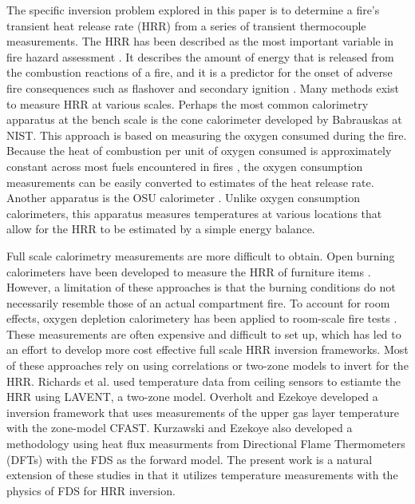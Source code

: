 \documentclass{article}
\begin{document}
The specific inversion problem explored in this paper is to determine a fire's transient heat release rate (HRR) from a series of transient thermocouple measurements. The HRR has been described as the most important variable in fire hazard assessment \cite{babrauskas1992heat}. It describes the amount of energy that is released from the combustion reactions of a fire, and it is a predictor for the onset of adverse fire consequences such as flashover \cite{mccaffrey1981estimating} and secondary ignition \cite{jahn2008effect}. Many methods exist to measure HRR at various scales. Perhaps the most common calorimetry apparatus at the bench scale is the cone calorimeter \cite{babrauskas1984development} developed by Babrauskas at NIST. This approach is based on measuring the oxygen consumed during the fire. Because the heat of combustion per unit of oxygen consumed is approximately constant across most fuels encountered in fires \cite{huggett1980estimation}, the oxygen consumption measurements can be easily converted to estimates of the heat release rate. Another apparatus is the OSU calorimeter \cite{smith1996heat}. Unlike oxygen consumption calorimeters, this apparatus measures temperatures at various locations that allow for the HRR to be estimated by a simple energy balance. 

Full scale calorimetry measurements are more difficult to obtain. Open burning calorimeters have been developed to measure the HRR of furniture items \cite{babrauskas1982upholstered}. However, a limitation of these approaches is that the burning conditions do not necessarily resemble those of an actual compartment fire. To account for room effects, oxygen depletion calorimetery has been applied to room-scale fire tests \cite{abecassis2008characterisation}. These measurements are often expensive and difficult to set up, which has led to an effort to develop more cost effective full scale HRR inversion frameworks. Most of these approaches rely on using correlations or two-zone models to invert for the HRR. Richards et al. \cite{richards1997fire} used temperature data from ceiling sensors to estiamte the HRR using LAVENT, a two-zone model. Overholt and Ezekoye \cite{overholt2012characterizing} developed a inversion framework that uses measurements of the upper gas layer temperature with the zone-model CFAST. Kurzawski and Ezekoye also developed a methodology using heat flux measurments from Directional Flame Thermometers (DFTs) with the FDS as the forward model. The present work is a natural extension of these studies in that it utilizes temperature measurements with the physics of FDS for HRR inversion.
\end{document}
